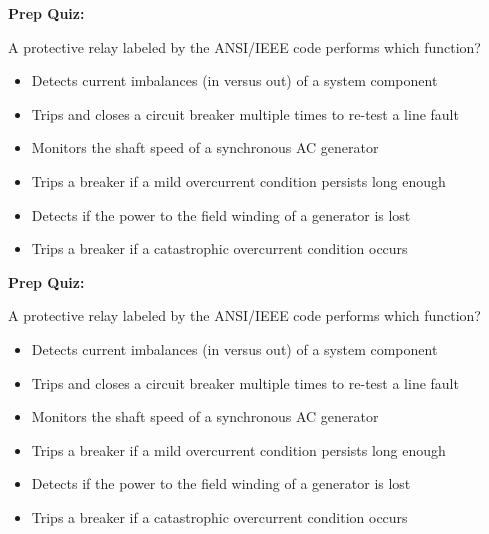 \vfil \eject

\noindent
{\bf Prep Quiz:}

A protective relay labeled by the ANSI/IEEE code  performs which function?

\begin{itemize}
\item{} Detects current imbalances (in versus out) of a system component
\vskip 5pt 
\item{} Trips and closes a circuit breaker multiple times to re-test a line fault
\vskip 5pt 
\item{} Monitors the shaft speed of a synchronous AC generator
\vskip 5pt 
\item{} Trips a breaker if a mild overcurrent condition persists long enough
\vskip 5pt 
\item{} Detects if the power to the field winding of a generator is lost
\vskip 5pt 
\item{} Trips a breaker if a catastrophic overcurrent condition occurs
\end{itemize}















\vfil \eject

\noindent
{\bf Prep Quiz:}

A protective relay labeled by the ANSI/IEEE code  performs which function?

\begin{itemize}
\item{} Detects current imbalances (in versus out) of a system component
\vskip 5pt 
\item{} Trips and closes a circuit breaker multiple times to re-test a line fault
\vskip 5pt 
\item{} Monitors the shaft speed of a synchronous AC generator
\vskip 5pt 
\item{} Trips a breaker if a mild overcurrent condition persists long enough
\vskip 5pt 
\item{} Detects if the power to the field winding of a generator is lost
\vskip 5pt 
\item{} Trips a breaker if a catastrophic overcurrent condition occurs
\end{itemize}















